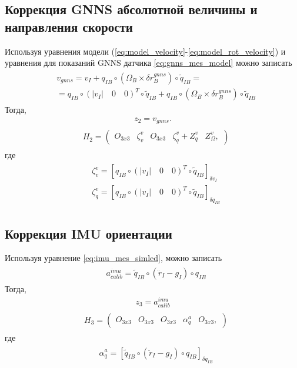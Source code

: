 \documentclass[a4paper,12pt]{article}
\begin{document}
\subsection{Коррекция GNNS абсолютной величины и направления скорости}
Используя уравнения модели (\ref{eq:model_velocity}-\ref{eq:model_rot_velocity}) и уравнения для показаний GNNS датчика \eqref{eq:gnns_mes_model} можно записать
\begin{align}
\begin{split}
&v_{gnns} = v_I + q_{IB} \circ  (\Omega_B \times \delta r^{gnns}_B) \circ \tilde{q}_{IB} = \\
& = q_{IB} \circ (|v_I| \quad 0 \quad 0)^T \circ \tilde{q}_{IB} + q_{IB} \circ  (\Omega_B \times \delta r^{gnns}_B) \circ \tilde{q}_{IB}
\end{split}
\end{align}
Тогда, 
\begin{align}
z_2 = v_{gnns}.
\end{align}
\begin{align}
\begin{split}
&H_2 =
\begin{pmatrix}
O_{3x3} & \zeta^v_v & O_{3x3} & \zeta^v_q + Z^v_q & Z^v_{\Omega},
\end{pmatrix}
\end{split}
\end{align}
где
\begin{align}
\begin{split}
&\zeta^v_v = [q_{IB} \circ (|v_I| \quad 0 \quad 0)^T \circ \tilde{q}_{IB}]_{\delta v_I} \\
&\zeta^v_q = [q_{IB} \circ (|v_I| \quad 0 \quad 0)^T \circ \tilde{q}_{IB}]_{\delta q_{IB}}
\end{split}
\end{align}

\subsection{Коррекция IMU ориентации}
Используя уравнение \eqref{eq:imu_mes_simled}, можно записать
\begin{align} 
\begin{split}
&a^{imu}_{calib}  = \tilde{q}_{IB} \circ (\ddot{r}_{I} - g_I) \circ q_{IB}
\end{split}
\end{align}
Тогда, 
\begin{align}
z_3 = a^{imu}_{calib}
\end{align}
\begin{align}
\begin{split}
&H_3 =
\begin{pmatrix}
O_{3x3} & O_{3x3} & O_{3x3} & \alpha^a_q & O_{3x3},
\end{pmatrix}
\end{split}
\end{align}
где
\begin{align}
\begin{split}
&\alpha^a_q = [\tilde{q}_{IB} \circ (\ddot{r}_{I} - g_I) \circ q_{IB}]_{\delta {q}_{IB}}
\end{split}
\end{align}
\end{document}
